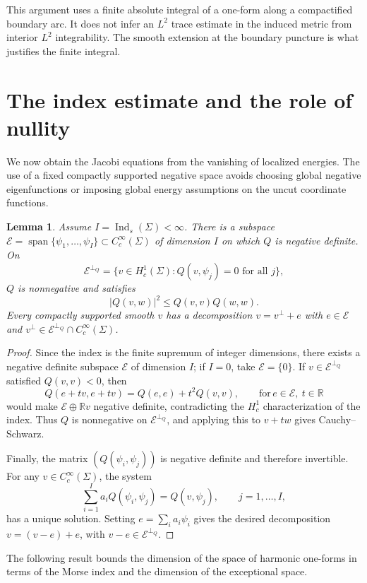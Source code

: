 \documentclass[11pt]{amsart}
\numberwithin{equation}{section}
\newtheorem{lemma}[theorem]{Lemma}
\theoremstyle{definition}
\theoremstyle{remark}
\newcommand{\R}{\mathbb R}
\newcommand{\EE}{\mathcal E}
\DeclareMathOperator{\Ind}{Ind}
\DeclareMathOperator{\spanop}{span}
\begin{document}
This argument uses a finite absolute integral of a one-form along a compactified boundary arc. It does not infer an $L^2$ trace estimate in the induced metric from interior $L^2$ integrability. The smooth extension at the boundary puncture is what justifies the finite integral.

\section{The index estimate and the role of nullity}\label{sec:index}
We now obtain the Jacobi equations from the vanishing of localized energies. The use of a fixed compactly supported negative space avoids choosing global negative eigenfunctions or imposing global energy assumptions on the uncut coordinate functions.

\begin{lemma}\label{lem:negative-space}
Assume $I=\Ind_s(\Sigma)<\infty$. There is a subspace
$\EE=\spanop\{\psi_1,\ldots,\psi_I\}\subset C_c^\infty(\Sigma)$
of dimension $I$ on which $Q$ is negative definite. On
\[
\EE^{\perp_Q}=
\{v\in H_c^1(\Sigma):Q(v,\psi_j)=0\text{ for all }j\},
\]
$Q$ is nonnegative and satisfies
\[
|Q(v,w)|^2\le Q(v,v)Q(w,w).
\]
Every compactly supported smooth $v$ has a decomposition
$v=v^\perp+e$ with $e\in\EE$ and $v^\perp\in\EE^{\perp_Q}\cap C_c^\infty(\Sigma)$.
\end{lemma}
\begin{proof}
Since the index is the finite supremum of integer dimensions, there
exists a negative definite subspace $\EE$ of dimension $I$; if $I=0$,
take $\EE=\{0\}$. If $v\in\EE^{\perp_Q}$ satisfied $Q(v,v)<0$, then
\[
Q(e+tv,e+tv)=Q(e,e)+t^2Q(v,v),
\qquad \text{for}\, e\in\EE,\ t\in\R
\]
would make $\EE\oplus\R v$ negative definite, contradicting the
$H_c^1$ characterization of the index. Thus $Q$ is nonnegative on
$\EE^{\perp_Q}$, and applying this to $v+tw$ gives Cauchy--Schwarz.

Finally, the matrix $(Q(\psi_i,\psi_j))$ is negative definite and
therefore invertible. For any $v\in C_c^\infty(\Sigma)$, the system
\[
\sum_{i=1}^I a_iQ(\psi_i,\psi_j)=Q(v,\psi_j),
\qquad j=1,\ldots,I,
\]
has a unique solution. Setting $e=\sum_i a_i\psi_i$ gives the desired
decomposition $v=(v-e)+e$, with $v-e\in\EE^{\perp_Q}$.
\end{proof}

The following result bounds the dimension of the space of harmonic one-forms in terms of the Morse index and the dimension of the exceptional space.
\end{document}
